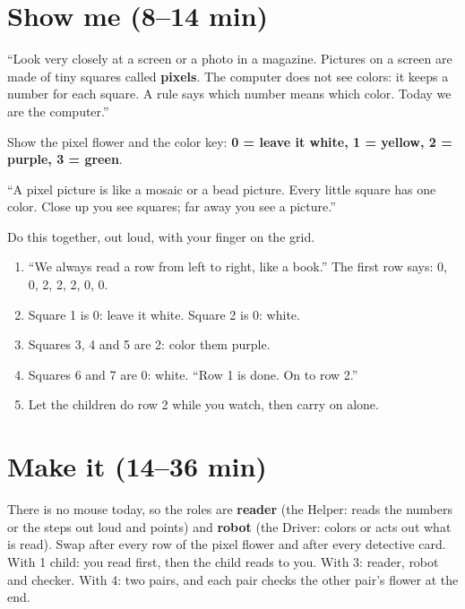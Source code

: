 \section{Show me (8--14 min)}
\begin{teacherscript}
\enquote{Look very closely at a screen or a photo in a magazine. Pictures on a screen are made of tiny squares called \textbf{pixels}. The computer does not see colors: it keeps a number for each square. A rule says which number means which color. Today we are the computer.}

Show the pixel flower and the color key: \textbf{0 = leave it white, 1 = yellow, 2 = purple, 3 = green}.
\end{teacherscript}

\begin{analogy}[A mosaic]
\enquote{A pixel picture is like a mosaic or a bead picture. Every little square has one color. Close up you see squares; far away you see a picture.}
\end{analogy}

\begin{workedexample}
Do this together, out loud, with your finger on the grid.
\begin{enumerate}[leftmargin=1.4em,itemsep=1pt]
  \item \enquote{We always read a row from left to right, like a book.} The first row says: 0, 0, 2, 2, 2, 0, 0.
  \item Square 1 is 0: leave it white. Square 2 is 0: white.
  \item Squares 3, 4 and 5 are 2: color them purple.
  \item Squares 6 and 7 are 0: white. \enquote{Row 1 is done. On to row 2.}
  \item Let the children do row 2 while you watch, then carry on alone.
\end{enumerate}
\end{workedexample}

\section{Make it (14--36 min)}
\begin{pairroles}
There is no mouse today, so the roles are \textbf{reader} (the Helper: reads the numbers or the steps out loud and points) and \textbf{robot} (the Driver: colors or acts out what is read). Swap after every row of the pixel flower and after every detective card. With 1 child: you read first, then the child reads to you. With 3: reader, robot and checker. With 4: two pairs, and each pair checks the other pair's flower at the end.
\end{pairroles}

